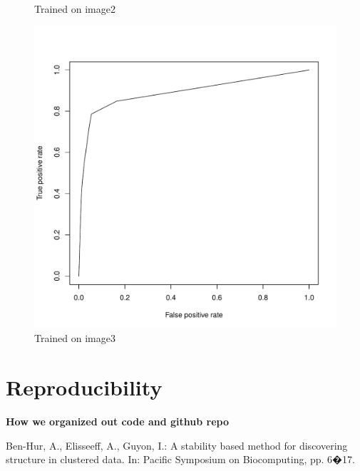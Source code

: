 \documentclass{article}\usepackage[]{graphicx}\usepackage[]{color}
\begin{document}
\begin{figure}[h]
  \caption{Trained on image2}\label{}
\endminipage\hfill
{}%
  \includegraphics[width=\linewidth]{ROC_image8.pdf}
  \caption{Trained on image3}\label{}
\endminipage
\end{figure}


\section{Reproducibility}

{\bf How we organized out code and github repo}


 \begin{thebibliography}{1}

 Ben-Hur, A., Elisseeff, A., Guyon, I.: A stability based method for discovering structure in clustered data. In: Pacific Symposium on Biocomputing, pp. 6�17.   
\end{thebibliography}
\end{document}
